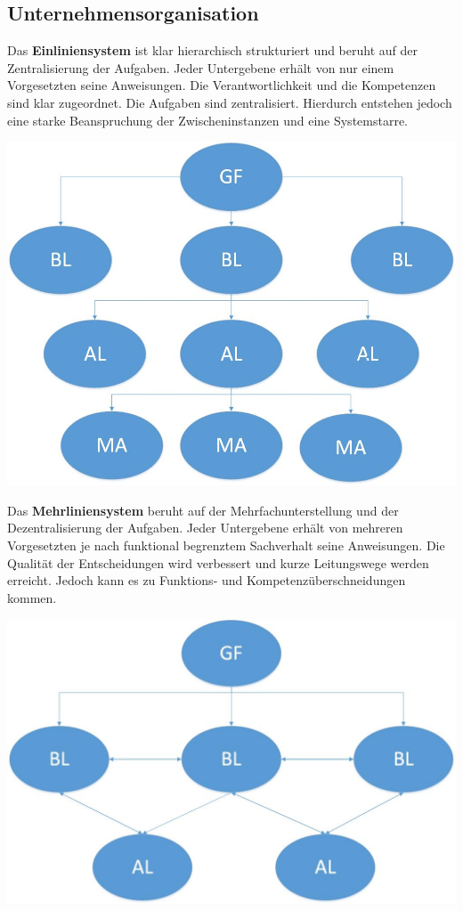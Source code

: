 

\subsection{Unternehmensorganisation}

Das \textbf{Einliniensystem} ist klar hierarchisch strukturiert und beruht auf der Zentralisierung der Aufgaben. Jeder Untergebene erhält von nur einem Vorgesetzten seine Anweisungen. Die Verantwortlichkeit und die Kompetenzen sind klar zugeordnet. Die Aufgaben sind zentralisiert. Hierdurch entstehen jedoch eine starke Beanspruchung der Zwischeninstanzen und eine Systemstarre.

\includegraphics[scale=0.3]{1jahr_pictures/lf02-pic/lf02-einliniensystem.jpg}

Das \textbf{Mehrliniensystem} beruht auf der Mehrfachunterstellung und der Dezentralisierung der Aufgaben. Jeder Untergebene erhält von mehreren Vorgesetzten je nach funktional begrenztem Sachverhalt seine Anweisungen. Die Qualität der Entscheidungen wird verbessert und kurze Leitungswege werden erreicht. Jedoch kann es zu Funktions- und Kompetenzüberschneidungen kommen.
 
\includegraphics[scale=0.3]{1jahr_pictures/lf02-pic/lf02-mehrliniensystem.jpg}

